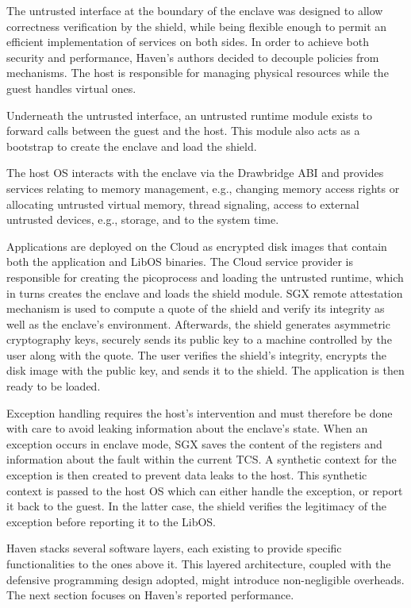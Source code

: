 The untrusted interface at the boundary of the enclave was designed to allow correctness verification by the shield, while being flexible enough to permit an efficient implementation of services on both sides.
In order to achieve both security and performance, Haven's authors decided to decouple policies from mechanisms.
The host is responsible for managing physical resources while the guest handles virtual ones.

Underneath the untrusted interface, an untrusted runtime module exists to forward calls between the guest and the host.
This module also acts as a bootstrap to create the enclave and load the shield.

The host OS interacts with the enclave via the Drawbridge ABI and provides services relating to memory management, e.g., changing memory access rights or allocating untrusted virtual memory, thread signaling, access to external untrusted devices, e.g., storage, and to the system time.

Applications are deployed on the Cloud as encrypted disk images that contain both the application and LibOS binaries.
The Cloud service provider is responsible for creating the picoprocess and loading the untrusted runtime, which in turns creates the enclave and loads the shield module.
SGX remote attestation mechanism is used to compute a quote of the shield and verify its integrity as well as the enclave's environment.
Afterwards, the shield generates asymmetric cryptography keys, securely sends its public key to a machine controlled by the user along with the quote.
The user verifies the shield's integrity, encrypts the disk image with the public key, and sends it to the shield.
The application is then ready to be loaded.

Exception handling requires the host's intervention and must therefore be done with care to avoid leaking information about the enclave's state.
When an exception occurs in enclave mode, SGX saves the content of the registers and information about the fault within the current TCS.
A synthetic context for the exception is then created to prevent data leaks to the host.
This synthetic context is passed to the host OS which can either handle the exception, or report it back to the guest.
In the latter case, the shield verifies the legitimacy of the exception before reporting it to the LibOS.

Haven stacks several software layers, each existing to provide specific functionalities to the ones above it.
This layered architecture, coupled with the defensive programming design adopted, might introduce non-negligible overheads.
The next section focuses on Haven's reported performance.


